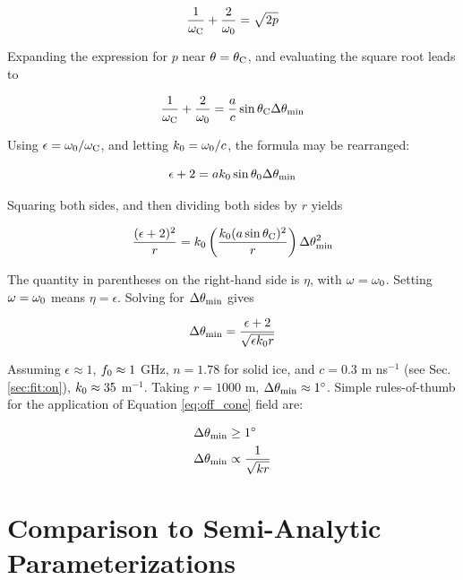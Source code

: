 \documentclass[amsmath,amssymb,aps,prd,10pt,twocolumn]{revtex4}
\begin{document}
\begin{equation}
\frac{1}{\omega_{\rm C}} + \frac{2}{\omega_{\rm 0}} = \sqrt{2p}
\end{equation}

Expanding the expression for $p$ near $\theta = \theta_{\rm C}$, and evaluating the square root leads to

\begin{equation}
\frac{1}{\omega_{\rm C}} + \frac{2}{\omega_{\rm 0}} = \frac{a}{c}\sin\theta_{\rm C} \Delta\theta_{\rm min}
\end{equation}

Using $\epsilon = \omega_{\rm 0}/\omega_{\rm C}$, and letting $k_{\rm 0} = \omega_{\rm 0}/c$, the formula may be rearranged:

\begin{equation}
\epsilon + 2 = a k_{\rm 0} \sin\theta_{\rm 0}\Delta\theta_{\rm min}
\end{equation}

Squaring both sides, and then dividing both sides by $r$ yields

\begin{equation}
\frac{(\epsilon+2)^2}{r} = k_{\rm 0} \left(\frac{k_{\rm 0} (a\sin\theta_{\rm C})^2}{r}\right)\Delta\theta^2_{\rm min}
\end{equation}

The quantity in parentheses on the right-hand side is $\eta$, with $\omega = \omega_{\rm 0}$.  Setting $\omega = \omega_{\rm 0}$ means $\eta = \epsilon$.  Solving for $\Delta\theta_{\rm min}$ gives

\begin{equation}
\Delta\theta_{\rm min} = \frac{\epsilon+2}{\sqrt{\epsilon k_{\rm 0} r}}
\end{equation}

Assuming $\epsilon \approx 1$, $f_{\rm 0} \approx 1$ GHz, $n = 1.78$ for solid ice, and $c = 0.3$ m ns$^{-1}$ (see Sec. \ref{sec:fit:on}), $k_{\rm 0} \approx 35$ m$^{-1}$.  Taking $r = 1000$ m, $\Delta\theta_{\rm min} \approx 1^{\circ}$.  Simple rules-of-thumb for the application of Equation \ref{eq:off_cone} field are:

\begin{align}
\Delta\theta_{\rm min} &\geq 1^{\circ} \\
\Delta\theta_{\rm min} &\propto \frac{1}{\sqrt{kr}}
\end{align}

\section{Comparison to Semi-Analytic Parameterizations}
\label{sec:fit}
\end{document}
